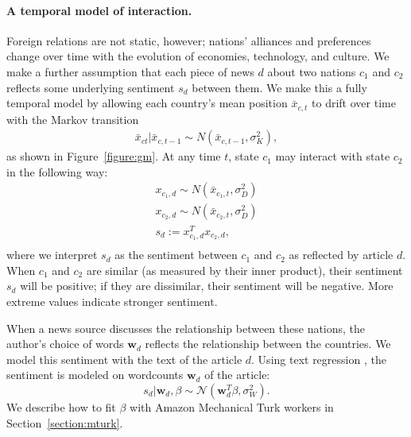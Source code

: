 \paragraph{A temporal model of interaction.}
Foreign relations are not static, however; nations' alliances and
preferences change over time with the evolution of economies,
technology, and culture.  We make a further assumption that each piece
of news $d$ about two nations $c_1$ and $c_2$ reflects some underlying
sentiment $s_d$ between them.  We make this a fully temporal model by
allowing each country's mean position $\bar x_{c,t}$ to drift over
time with the Markov transition
\begin{align}
  \bar x_{ct} | \bar x_{c,t-1} \sim N(\bar x_{c,t-1}, \sigma_K^2),
\end{align}
as shown in Figure~\ref{figure:gm}. At any time $t$, state $c_1$ may interact with state $c_2$ in the following way:
\begin{align}
  x_{c_1,d} \sim N(\bar x_{c_1, t}, \sigma_D^2) \nonumber \\
  x_{c_2,d} \sim N(\bar x_{c_2, t}, \sigma_D^2) \nonumber \\
  s_d := x_{c_1,d}^T x_{c_2,d}, \nonumber \\
\label{equation:sentiment}
\end{align}
where we interpret $s_d$ as the sentiment between $c_1$ and $c_2$ as
reflected by article $d$.  When $c_1$ and $c_2$ are similar (as
measured by their inner product), their sentiment $s_d$ will be
positive; if they are dissimilar, their sentiment will be negative.
More extreme values indicate stronger sentiment.

\label{section:text_regression}
When a news source discusses the relationship between these nations,
the author's choice of words $\bm w_d$ reflects the relationship
between the countries.  We model this sentiment with the text of the
article $d$.  Using text regression \cite{kogan:2009}, the sentiment is modeled on wordcounts $\bm w_d$ of the article:
\[
  s_d | \bm w_d, \beta \sim \mathcal{N}( \bm w_d^T \beta , \sigma_W^2 ).
\]
We describe how to fit $\beta$ with Amazon Mechanical Turk workers in
Section~\ref{section:mturk}.


